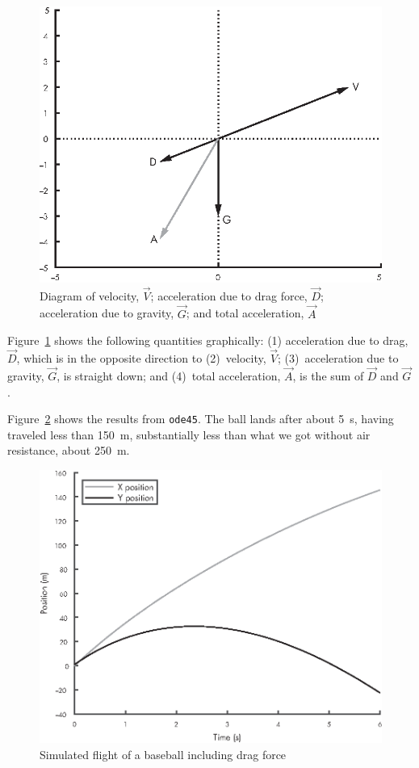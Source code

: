 \begin{figure}[ht]
\includegraphics{book/images/figure12_03_new.eps}
\caption{Diagram of velocity, $\vec{V}$; acceleration due to drag force, 
$\vec{D}$; acceleration due to gravity, $\vec{G}$; and total acceleration, $\vec{A}$}
\label{fig:vector3}
\end{figure}

Figure~\ref{fig:vector3} shows the following quantities graphically:  (1) acceleration due to drag, $\vec{D}$, which is in the opposite direction to (2)~velocity, $\vec{V}$; (3)~acceleration due to gravity, $\vec{G}$, is straight down; and (4)~total acceleration, $\vec{A}$, is the sum of $\vec{D}$ and $\vec{G}$.

\newpage
Figure~\ref{fig:baseball2} shows the results from \lstinline{ode45}.  The ball lands after about \SI{5}{\second}, having traveled less than \SI{150}{\meter}, substantially less than what we got without air resistance, about \SI{250}{\meter}.

\begin{figure}
\includegraphics[scale=0.90]{book/images/figure12_04_new.eps}
\caption{Simulated flight of a baseball including drag force}
\label{fig:baseball2}
\end{figure}

